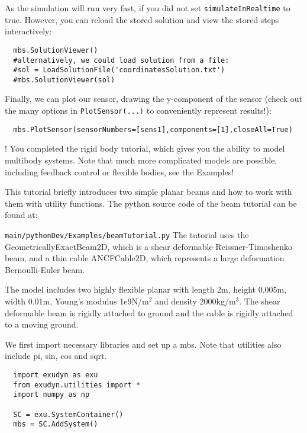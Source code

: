\noindent As the simulation will run very fast, if you did not set \texttt{simulateInRealtime} to true. However, you can reload the stored solution and view the stored steps interactively:
\pythonstyle\begin{lstlisting}
  mbs.SolutionViewer()
  #alternatively, we could load solution from a file:
  #sol = LoadSolutionFile('coordinatesSolution.txt')
  #mbs.SolutionViewer(sol)
\end{lstlisting}

\noindent Finally, we can plot our sensor, drawing the y-component of the sensor (check out the many options in \texttt{PlotSensor(...)} to conveniently represent results!):
\pythonstyle\begin{lstlisting}
  mbs.PlotSensor(sensorNumbers=[sens1],components=[1],closeAll=True)
\end{lstlisting}

\noindent {}! You completed the rigid body tutorial, which gives you the ability to model multibody systems. Note that much more complicated models are possible, including feedback control or flexible bodies, see the Examples!


This tutorial briefly introduces two simple planar beams and how to work with them with utility functions.
The python source code of the beam tutorial can be found at:
\bi
  \item[] \texttt{main/pythonDev/Examples/beamTutorial.py}
\ei
The tutorial uses the GeometricallyExactBeam2D, which is a shear deformable Reissner-Timoshenko beam, and a thin cable ANCFCable2D, which represents a large deformation Bernoulli-Euler beam.

\noindent The model includes two highly flexible planar with length 2m, height 0.005m, width 0.01m, 
Young's modulus 1e9N/m$^2$ and density 2000kg/m$^3$.
The shear deformable beam is rigidly attached to ground and the cable is rigidly attached to a moving ground.

\noindent We first import necessary libraries and set up a mbs. Note that utilities also include pi, sin, cos and sqrt.
\pythonstyle\begin{lstlisting}
  import exudyn as exu
  from exudyn.utilities import *
  import numpy as np

  SC = exu.SystemContainer()
  mbs = SC.AddSystem()
\end{lstlisting}

